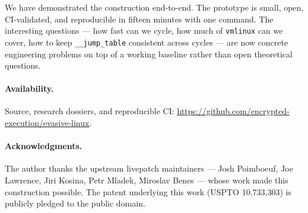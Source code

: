 \documentclass[10pt,letterpaper]{article}
\begin{document}
We have demonstrated the construction end-to-end. The prototype is
small, open, CI-validated, and reproducible in fifteen minutes with
one command. The interesting questions --- how fast can we cycle,
how much of \texttt{vmlinux} can we cover, how to keep
\texttt{\_\_jump\_table} consistent across cycles --- are now
concrete engineering problems on top of a working baseline rather
than open theoretical questions.

\paragraph{Availability.} Source, research dossiers, and
reproducible CI:
\url{https://github.com/encrypted-execution/evasive-linux}.

\paragraph{Acknowledgments.} The author thanks the upstream livepatch
maintainers --- Josh Poimboeuf, Joe Lawrence, Jiri Kosina, Petr
Mladek, Miroslav Benes --- whose work made this construction possible.
The patent underlying this work (USPTO 10,733,303) is publicly
pledged to the public domain.

\printbibliography
\end{document}
